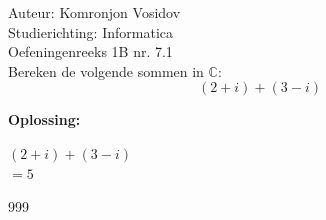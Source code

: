 \documentclass[a4paper]{article}
\begin{document}
	
	\noindent \large Auteur: Komronjon Vosidov \\
	\noindent \large Studierichting: Informatica\\
	\noindent \large Oefeningenreeks 1B nr. 7.1\\
	
	
	
	\normalsize
	Bereken de volgende sommen in $\mathbb{C}$:
	\begin{equation*}
		(2+i)+(3-i)
	\end{equation*}
	
	
	\noindent \textbf{Oplossing:}
	
	$(2+i)+(3-i)$ \\	
	
	$= 5 $ \\


\begin{thebibliography}{999}
	
\end{thebibliography}
	
	
	
\end{document}
